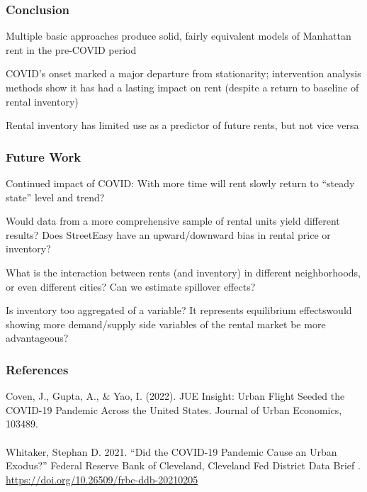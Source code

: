 \documentclass[t]{beamer}
\let\tempone\itemize
\let\temptwo\enditemize
\renewenvironment{itemize}{\tempone\addtolength{\itemsep}{0.5\baselineskip}}{\temptwo}
\begin{document}
\begin{frame}
\frametitle{Conclusion}
\begin{itemize}
\item Multiple basic approaches produce solid, fairly equivalent models of Manhattan rent in the pre-COVID period
\item COVID's onset marked a major departure from stationarity; intervention analysis methods show it has had a lasting impact on rent (despite a return to baseline of rental inventory)
\item Rental inventory has limited use as a predictor of future rents, but not vice versa
\end{itemize}
\end{frame}

\begin{frame}
\frametitle{Future Work}

\begin{itemize}
\item Continued impact of COVID: With more time will rent slowly return to ``steady state'' level and trend?

\item Would data from a more comprehensive sample of rental units yield different results? Does StreetEasy have an upward/downward bias in rental price or inventory?

\item What is the interaction between rents (and inventory) in different neighborhoods, or even different cities? Can we estimate spillover effects?

\item Is inventory too aggregated of a variable? It represents equilibrium effects\textemdash would showing more demand/supply side variables of the rental market be more advantageous?
\end{itemize}

\end{frame}

\begin{frame}
\frametitle{References}

\begin{hangparas}{.25in}{1}

Coven, J., Gupta, A., & Yao, I. (2022). JUE Insight: Urban Flight Seeded the COVID-19 Pandemic Across the United States. Journal of Urban Economics, 103489.
\\~\\ %
Whitaker, Stephan D. 2021. ``Did the COVID-19 Pandemic Cause an Urban Exodus?'' Federal Reserve Bank of Cleveland, Cleveland Fed District Data Brief . \href{https://www.clevelandfed.org/publications/cleveland-fed-district-data-brief/2021/cfddb-20210205-did-the-covid-19-pandemic-cause-an-urban-exodus}{https://doi.org/10.26509/frbc-ddb-20210205}

\end{hangparas}
\end{frame}
\end{document}
